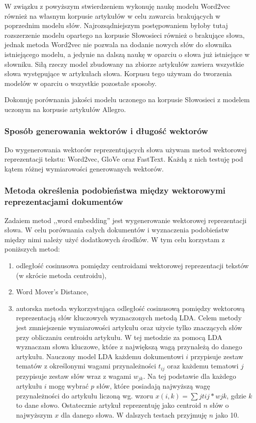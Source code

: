 \documentclass[pl]{minipw} %
\begin{document}
W związku z powyższym stwierdzeniem wykonuję naukę modelu Word2vec również na własnym korpusie artykułów w celu zawarcia brakujących w poprzednim modelu słów. Najrozsądniejszym postępowaniem byłoby tutaj rozszerzenie modelu opartego na korpusie Słowosieci również o brakujące słowa, jednak metoda Word2vec nie pozwala na dodanie nowych słów do słownika istniejącego modelu, a jedynie na dalszą naukę w oparciu o słowa już istniejące w słowniku. Siłą rzeczy model zbudowany na zbiorze artykułów zawiera wszystkie słowa występujące w artykułach słowa. Korpusu tego używam do tworzenia modelów w oparciu o wszystkie pozostałe sposoby.

Dokonuję porównania jakości modelu uczonego na korpusie Słowosieci z modelem uczonym na korpusie artykułów Allegro.

\subsubsection{Sposób generowania wektorów i długość wektorów}
Do wygenerowania wektorów reprezentujących słowa używam metod wektorowej reprezentacji tekstu: Word2vec, GloVe oraz FastText. Każdą z nich testuję pod kątem różnej wymiarowości generowanych wektorów.

\subsubsection{Metoda określenia podobieństwa między wektorowymi reprezentacjami dokumentów}
Zadaiem metod ,,word embedding'' jest wygenerowanie wektorowej reprezentacji słowa. W celu porównania całych dokumentów i wyznaczenia podobieństw między nimi należy użyć dodatkowych środków. W tym celu korzystam z poniższych metod:
\begin{enumerate}
	\item odległość cosinusowa pomiędzy centroidami wektorowej reprezentacji tekstów (w skrócie metoda centroidu),
	\item Word Mover's Distance,
	\item autorska metoda wykorzystująca odległość cosinusową pomiędzy wektorową reprezentacją słów kluczowych wyznaczonych metodą LDA. Celem metody jest zmniejszenie wymiarowości artykułu oraz użycie tylko znaczących słów przy obliczaniu centroidu artykułu. W tej metodzie za pomocą LDA wyznaczam słowa kluczowe, które z największą wagą przynależą do danego artykułu. Nauczony model LDA każdemu dokumentowi $i$ przypisuje zestaw tematów z określonymi wagami przynależności $t_{ij}$ oraz każdemu tematowi $j$ przypisuje zestaw słów wraz z wagami $w_{jk}$. Na tej podstawie dla każdego artykułu $i$ mogę wybrać $p$ słów, które posiadają najwyższą wagę przynależności do artykułu liczoną wg. wzoru $x(i,k)=\sum{j}t{ij}*w{jk}$, gdzie $k$ to dane słowo. Ostatecznie artykuł reprezentuję jako centroid $n$ słów o najwyższym $x$ dla danego słowa. W dalszych testach przyjmuję $n$ jako 10.
\end{enumerate}
\end{document}
